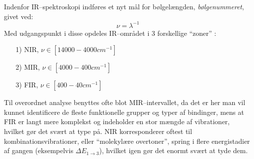     Indenfor IR--spektroskopi indføres et nyt mål for bølgelængden, \textit{bølgenummeret}, givet ved:
    \[
        \nu=\lambda^{-1}
    \]
    Med udgangspunkt i disse opdeles IR--området i 3 forskellige ``zoner'' \parencite{Shah2018}:
    \begin{itemize}
        \item[1)] NIR, $\nu \in \left[14000-4000\si{cm^{-1}}\right]$
        \item[2)] MIR, $\nu \in \left[4000-400\si{cm^{-1}}\right]$
        \item[3)] FIR, $\nu \in \left[400-40\si{cm^{-1}}\right]$
    \end{itemize}
    Til overordnet analyse benyttes ofte blot MIR--intervallet, da det er her man vil kunnet identificere de fleste funktionelle grupper og typer af bindinger, mens at FIR er langt mere komplekst og indeholder en stor mængde af vibrationer, hvilket gør det svært at type på. NIR korresponderer oftest til kombinationsvibrationer, eller ``molekylære overtoner'', spring i flere energistadier af gangen (eksempelvis $\Delta E_{1\rightarrow 3}$), hvilket igen gør det enormt svært at tyde dem.
    \begin{table}[H]\centering
        \caption{Bølgernummerintervaller for nogle karakteristiske funktionelle grupper \parencite{Geor2004}.}
    \end{table}

